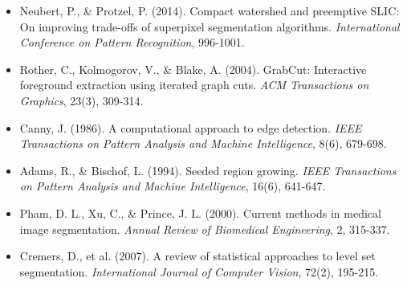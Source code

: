 \documentclass[a4paper, 11pt]{article}
\begin{document}
\begin{itemize}
\item Neubert, P., \& Protzel, P. (2014). Compact watershed and preemptive SLIC: On improving trade-offs of superpixel segmentation algorithms. \textit{International Conference on Pattern Recognition}, 996-1001.
\item Rother, C., Kolmogorov, V., \& Blake, A. (2004). GrabCut: Interactive foreground extraction using iterated graph cuts. \textit{ACM Transactions on Graphics}, 23(3), 309-314.
\item Canny, J. (1986). A computational approach to edge detection. \textit{IEEE Transactions on Pattern Analysis and Machine Intelligence}, 8(6), 679-698.
\item Adams, R., \& Bischof, L. (1994). Seeded region growing. \textit{IEEE Transactions on Pattern Analysis and Machine Intelligence}, 16(6), 641-647.
\item Pham, D. L., Xu, C., \& Prince, J. L. (2000). Current methods in medical image segmentation. \textit{Annual Review of Biomedical Engineering}, 2, 315-337.
\item Cremers, D., et al. (2007). A review of statistical approaches to level set segmentation. \textit{International Journal of Computer Vision}, 72(2), 195-215.
\end{itemize}
\end{document}
